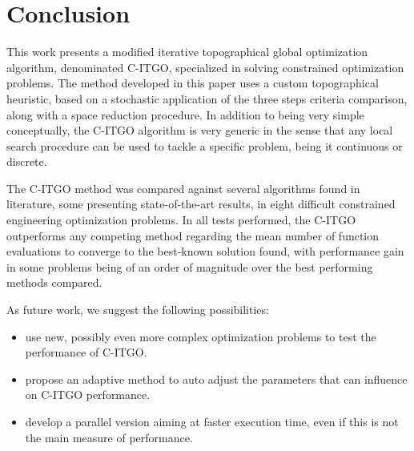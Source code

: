 \section{Conclusion} \label{sec:Conclusion}

This work presents a modified iterative topographical global optimization algorithm, denominated C-ITGO, specialized in solving constrained optimization problems. The method developed in this paper uses a custom topographical heuristic, based on a stochastic application of the three steps criteria comparison, along with a space reduction procedure. In addition to being very simple conceptually, the C-ITGO algorithm is very generic in the sense that any local search procedure can be used to tackle a specific problem, being it continuous or discrete.

The C-ITGO method was compared against several algorithms found in literature, some presenting state-of-the-art results, in eight difficult constrained engineering optimization problems. In all tests performed, the C-ITGO outperforms any competing method regarding the mean number of function evaluations to converge to the best-known solution found, with performance gain in some problems being of an order of magnitude over the best performing methods compared.

As future work, we suggest the following possibilities:

\begin{itemize}

    \item use new, possibly even more complex optimization problems to test the performance of C-ITGO.

    \item propose an adaptive method to auto adjust the parameters that can influence on C-ITGO performance.

    \item develop a parallel version aiming at faster execution time, even if this is not the main measure of performance.


\end{itemize}
